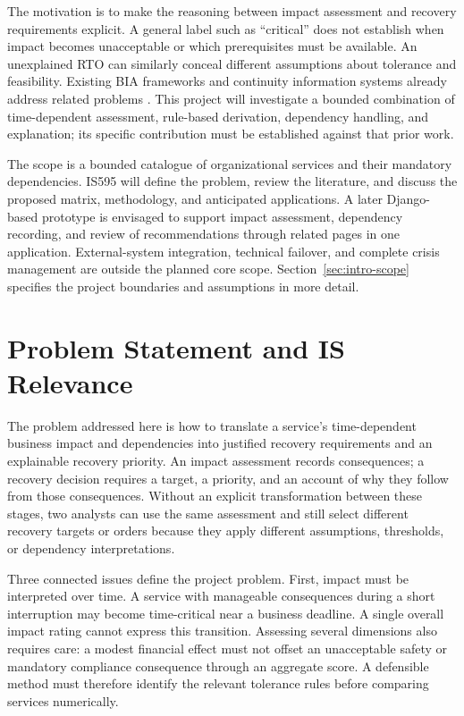 The motivation is to make the reasoning between impact assessment and recovery requirements explicit. A general label such as ``critical'' does not establish when impact becomes unacceptable or which prerequisites must be available. An unexplained RTO can similarly conceal different assumptions about tolerance and feasibility. Existing BIA frameworks and continuity information systems already address related problems \cite{torabi2014bia,idrees2019bcis}. This project will investigate a bounded combination of time-dependent assessment, rule-based derivation, dependency handling, and explanation; its specific contribution must be established against that prior work.

The scope is a bounded catalogue of organizational services and their mandatory dependencies. IS595 will define the problem, review the literature, and discuss the proposed matrix, methodology, and anticipated applications. A later Django-based prototype is envisaged to support impact assessment, dependency recording, and review of recommendations through related pages in one application. External-system integration, technical failover, and complete crisis management are outside the planned core scope. Section~\ref{sec:intro-scope} specifies the project boundaries and assumptions in more detail.

\section{Problem Statement and IS Relevance}
\label{sec:intro-problem}

The problem addressed here is how to translate a service's time-dependent business impact and dependencies into justified recovery requirements and an explainable recovery priority. An impact assessment records consequences; a recovery decision requires a target, a priority, and an account of why they follow from those consequences. Without an explicit transformation between these stages, two analysts can use the same assessment and still select different recovery targets or orders because they apply different assumptions, thresholds, or dependency interpretations.

Three connected issues define the project problem. First, impact must be interpreted over time. A service with manageable consequences during a short interruption may become time-critical near a business deadline. A single overall impact rating cannot express this transition. Assessing several dimensions also requires care: a modest financial effect must not offset an unacceptable safety or mandatory compliance consequence through an aggregate score. A defensible method must therefore identify the relevant tolerance rules before comparing services numerically.

